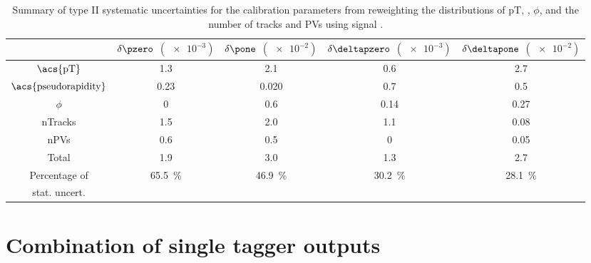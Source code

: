 \begin{table}
  \centering
  \caption{Summary of type II systematic uncertainties for the \SSpi calibration
  parameters from reweighting the distributions of \ac{pT}, \pseudorapidity,
  $\phi$, and the number of tracks and \acp{PV} using signal \sweights.
  \cite{Aaij:2015vza}}
  \label{tab:flavour_tagging:calibration:ss:systematics}
  \begin{tabular}{ccccc}
    \toprule
      & $\delta\pzero$ $(\num{e-3})$ & $\delta\pone$ $(\num{e-2})$ & $\delta\deltapzero$ $(\num{e-3})$ & $\delta\deltapone$ $(\num{e-2})$ \\
    \midrule
    $\text{\acs{pT}}$             & 1.3  & 2.1   & 0.6  & 2.7  \\
    $\text{\acs{pseudorapidity}}$ & 0.23 & 0.020 & 0.7  & 0.5  \\
    $\phi$                        & 0    & 0.6   & 0.14 & 0.27 \\
    nTracks                       & 1.5  & 2.0   & 1.1  & 0.08 \\
    nPVs                          & 0.6  & 0.5   & 0    & 0.05 \\
    \midrule
      Total                       & 1.9  & 3.0   & 1.3  & 2.7 \\
    \midrule
    Percentage of & 
    \multirow{2}[2]{*}{\SI{65.5}{\percent}} & 
    \multirow{2}[2]{*}{\SI{46.9}{\percent}} & 
    \multirow{2}[2]{*}{\SI{30.2}{\percent}} & 
    \multirow{2}[2]{*}{\SI{28.1}{\percent}} \\
    stat. uncert. \\
    \bottomrule
  \end{tabular}
\end{table}

\section{Combination of single tagger outputs}
\label{sec:flavour_tagging:combination}

